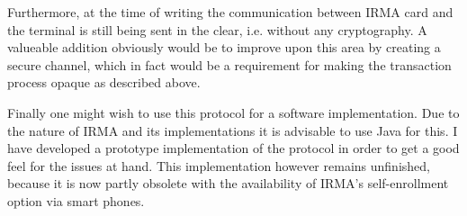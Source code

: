 Furthermore, at the time of writing the communication between IRMA card and the terminal is still being sent in the clear, i.e. without any cryptography. A valueable addition obviously would be to improve upon this area by creating a secure channel, which in fact would be a requirement for making the transaction process opaque as described above.

Finally one might wish to use this protocol for a software implementation. Due to the nature of IRMA and its implementations it is advisable to use Java for this. I have developed a prototype implementation of the protocol in order to get a good feel for the issues at hand. This implementation however remains unfinished, because it is now partly obsolete with the availability of IRMA's self-enrollment option via smart phones.

